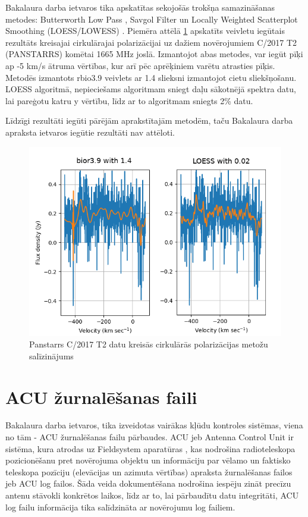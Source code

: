 Bakalaura darba ietvaros tika apskatītas sekojošās trokšņa samazināšanas metodes: Butterworth Low Pass \cite{butterworth}, Savgol Filter \cite{savgol} un Locally Weighted Scatterplot Smoothing (LOESS/LOWESS) \cite{loess}. Piemēra attēlā \ref{fig:loess} apskatīts veivletu iegūtais rezultāts kreisajai cirkulārajai polarizācijai uz dažiem novērojumiem C/2017 T2 (PANSTARRS) komētai 1665 MHz joslā. Izmantojot abas metodes, var iegūt pīķi ap -5 km/s ātruma vērtības, kur arī pēc aprēķiniem varētu atrasties pīķis. Metodēs izmantots rbio3.9 veivlets ar 1.4 slieksni izmantojot cietu sliekšņošanu. LOESS algoritmā, nepieciešams algoritmam sniegt daļu sākotnējā spektra datu, lai pareģotu katru y vērtību, līdz ar to algoritmam sniegts 2\% datu.


Līdzīgi rezultāti iegūti pārējām aprakstītajām metodēm, taču Bakalaura darba apraksta ietvaros iegūtie rezultāti nav attēloti.
\begin{figure}[H]

\centering
\includegraphics[width=\textwidth]{images/created/method-compare.png}
\caption{Panstarrs C/2017 T2 datu kreisās cirkulārās polarizācijas metožu salīzinājums}
\label{fig:loess}
\end{figure}


\section{ACU žurnalēšanas faili}

Bakalaura darba ietvaros, tika izveidotas vairākas kļūdu kontroles sistēmas, viena no tām - ACU žurnalēšanas failu pārbaudes. ACU jeb Antenna Control Unit ir sistēma, kura atrodas uz Fieldsystem aparatūras \cite{fieldsystem}, kas nodrošina radioteleskopa pozicionēšanu pret novērojuma objektu un informāciju par vēlamo un faktisko teleskopa pozīciju (elevācijas un azimuta vērtības) apraksta žurnalēšanas failos jeb ACU log failos. Šāda veida dokumentēšana nodrošina iespēju zināt precīzu antenu stāvokli konkrētos laikos, līdz ar to, lai pārbaudītu datu integritāti, ACU log failu informācija tika salīdzināta ar novērojumu log failiem.




